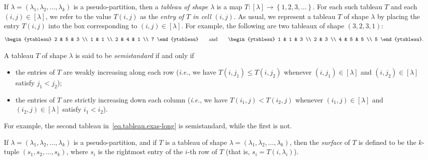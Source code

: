 \documentclass[reqno]{amsart}
\newcommand{\0}{\phantom{c}}
\newcommand{\diag}[1]{\left[#1\right]} %
\newenvironment{verlong}{}{}
\newcommand{\set}[1]{\left\{ #1 \right\}}
\newcommand{\tup}[1]{\left( #1 \right)}
\newcommand{\defn}[1]{{\color{darkred}\emph{#1}}} %
\theoremstyle{plain}
\theoremstyle{definition}
\numberwithin{equation}{section}
\begin{document}
If $\lambda = \tup{\lambda_1, \lambda_2, \dotsc, \lambda_k}$ is a pseudo-partition, then a \defn{tableau of shape $\lambda$} is a map $T \colon \diag{\lambda} \to \set{1,2,3,\ldots}$.
For each such tableau $T$ and each $(i,j) \in \diag{\lambda}$, we refer to the value $T(i,j)$ as the \defn{entry of $T$ in cell $\left(i,j\right)$}.
As usual, we represent a tableau $T$ of shape $\lambda$ by placing the entry $T(i,j)$ into the box corresponding to $(i,j) \in \diag{\lambda}$.
\begin{verlong}
For example, the following are two tableaux of shape $\tup{3,2,3,1}$:
\begin{equation}
\label{eq.tableau.exas-long}
\begin{ytableau} 2 & 5 & 3 \\ 1 & 1 \\ 2 & 4 & 1 \\ 7 \end{ytableau}\qquad
\text{and}\qquad
\begin{ytableau} 1 & 1 & 3 \\ 2 & 3 \\ 4 & 5 & 5 \\ 5 \end{ytableau}.
\end{equation}
\end{verlong}

A tableau $T$ of shape $\lambda$ is said to be \defn{semistandard} if and only if
\begin{itemize}
\item the entries of $T$ are weakly increasing along each row (\textit{i.e.}, we have $T(i,j_1) \leq T(i,j_2)$ whenever $(i,j_1) \in \diag{\lambda}$ and $(i,j_2) \in \diag{\lambda}$ satisfy $j_1 < j_2$);

\item the entries of $T$ are strictly increasing down each column (\textit{i.e.}, we have $T(i_1,j) < T(i_2,j)$ whenever $(i_1,j) \in \diag{\lambda}$ and $(i_2,j) \in \diag{\lambda}$ satisfy $i_1 < i_2$).
\end{itemize}

\begin{verlong}
For example, the second tableau in~\eqref{eq.tableau.exas-long} is semistandard, while the first is not.
\end{verlong}

If $\lambda = \tup{\lambda_1, \lambda_2, \dotsc, \lambda_k}$ is a pseudo-partition, and if $T$ is a tableau of shape $\lambda = \tup{\lambda_1, \lambda_2, \dotsc, \lambda_k}$,
then the \defn{surface} of $T$ is defined to be the $k$-tuple $(s_1, s_2, \dotsc, s_k)$, where $s_i$ is the rightmost entry of the $i$-th row of $T$ (that is, $s_i = T(i,\lambda_i)$).
\end{document}

